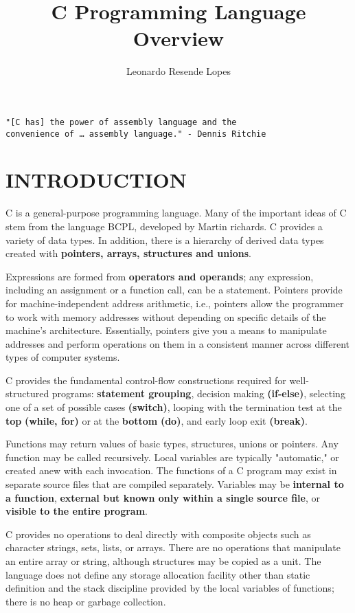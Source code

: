 \documentclass{article}
\title{C Programming Language Overview}
\author{Leonardo Resende Lopes}
\date{}
\begin{document}
\maketitle

\clearpage
\begin{verbatim}
"[C has] the power of assembly language and the 
convenience of … assembly language." - Dennis Ritchie
\end{verbatim}

\clearpage
\section{INTRODUCTION}

\clearpage
C is a general-purpose programming language.
Many of the important ideas of C stem from the language BCPL, developed by Martin richards. 
C provides a variety of data types. In addition, there is a hierarchy of derived data types created with \textbf{pointers, arrays, structures and unions}.

Expressions are formed from \textbf{operators and operands}; any expression, including an assignment or a function call, can be a statement. Pointers provide for machine-independent address arithmetic, i.e., pointers allow the programmer to work with memory addresses without depending on specific details of the machine's architecture. Essentially, pointers give you a means to manipulate addresses and perform operations on them in a consistent manner across different types of computer systems.

C provides the fundamental control-flow constructions required for well-structured programs: \textbf{statement grouping}, decision making \textbf{(if-else)}, selecting one of a set of possible cases \textbf{(switch)}, looping with the termination test at the \textbf{top} \textbf{(while, for)} or at the \textbf{bottom} \textbf{(do)}, and early loop exit \textbf{(break)}.

Functions may return values of basic types, structures, unions or pointers. Any function may be called recursively. Local variables are typically "automatic," or created anew with each invocation. The functions of a C program may exist in separate source files that are compiled separately. Variables may be \textbf{internal to a function}, \textbf{external but known only within a single source file}, or \textbf{visible to the entire program}.

C provides no operations to deal directly with composite objects such as character strings, sets, lists, or arrays. There are no operations that manipulate an entire array or string, although structures may be copied as a unit. The language does not define any storage allocation facility other than static definition and the stack discipline provided by the local variables of functions; there is no heap or garbage collection.
\end{document}
